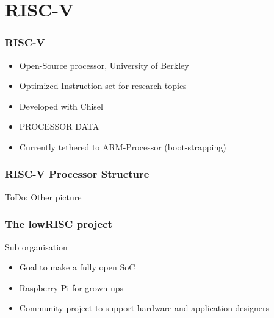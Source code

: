 \documentclass{beamer}
\begin{document}
\section{RISC-V}
\begin{frame}
	\frametitle{RISC-V}
	\begin{itemize}
		\item Open-Source processor, University of Berkley
		\item Optimized Instruction set for research topics
		\item Developed with Chisel
		\item PROCESSOR DATA
		\item Currently tethered to ARM-Processor (boot-strapping)
	\end{itemize}
\end{frame}

\begin{frame}
	\frametitle{RISC-V Processor Structure}
	ToDo: Other picture
	\begin{figure}[!h]
	\begin{center}
	\end{center}
	\end{figure}
\end{frame}

\begin{frame}
	\frametitle{The lowRISC project}
		Sub organisation 
		\begin{itemize}
		\item Goal to make a fully open SoC 
		\item Raspberry Pi for grown ups
		\item Community project to support hardware and application designers  
	\end{itemize}
\end{frame}
\end{document}

